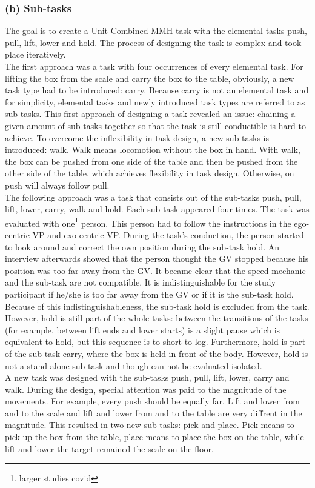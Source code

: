 \subsubsection{(b) Sub-tasks}
\label{sec:subTasks}
The goal is to create a Unit-Combined-MMH task with the elemental tasks push, pull, lift, lower and hold. The process of designing the task is complex and took place iteratively.\\
The first approach was a task with four occurrences of every elemental task. For lifting the box from the scale and carry the box to the table, obviously, a new task type had to be introduced: carry. Because carry is not an elemental task and for simplicity, elemental tasks and newly introduced task types are referred to as sub-tasks. This first approach of designing a task revealed an issue: chaining a given amount of sub-tasks together so that the task is still conductible is hard to achieve. To overcome the inflexibility in task design, a new sub-tasks is introduced: walk. Walk means locomotion without the box in hand. With walk, the box can be pushed from one side of the table and then be pushed from the other side of the table, which achieves flexibility in task design. Otherwise, on push will always follow pull.\\
The following approach was a task that consists out of the sub-tasks push, pull, lift, lower, carry, walk and hold. Each sub-task appeared four times. The task was evaluated with one\footnote{larger studies covid} person. This person had to follow the instructions in the ego-centric VP and exo-centric VP. During the task's conduction, the person started to look around and correct the own position during the sub-task hold. An interview afterwards showed that the person thought the GV stopped because his position was too far away from the GV. It became clear that the speed-mechanic and the sub-task are not compatible. It is indistinguishable for the study participant if he/she is too far away from the GV or if it is the sub-task hold. Because of this indistinguishableness, the sub-task hold is excluded from the task. However, hold is still part of the whole tasks: between the transitions of the tasks (for example, between lift ends and lower starts) is a slight pause which is equivalent to hold, but this sequence is to short to log. Furthermore, hold is part of the sub-task carry, where the box is held in front of the body. However, hold is not a stand-alone sub-task and though can not be evaluated isolated.\\
A new task was designed with the sub-tasks push, pull, lift, lower, carry and walk. During the design, special attention was paid to the magnitude of the movements. For example, every push should be equally far. Lift and lower from and to the scale and lift and lower from and to the table are very diffrent in the magnitude. This resulted in two new sub-tasks: pick and place. Pick means to pick up the box from the table, place means to place the box on the table, while lift and lower the target remained the scale on the floor.\\
